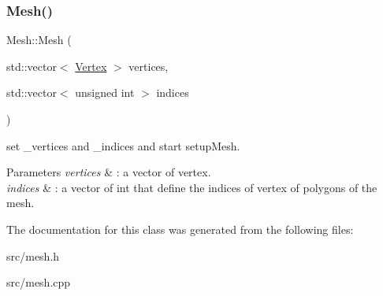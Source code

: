 \subsubsection{\texorpdfstring{Mesh()}{Mesh()}}
{\footnotesize\ttfamily Mesh\+::\+Mesh (\begin{DoxyParamCaption}\item[{std\+::vector$<$ \mbox{\hyperlink{class_vertex}{Vertex}} $>$}]{vertices,  }\item[{std\+::vector$<$ unsigned int $>$}]{indices }\end{DoxyParamCaption})}



set \+\_\+vertices and \+\_\+indices and start setup\+Mesh. 


\begin{DoxyParams}{Parameters}
{\em vertices} & \+: a vector of vertex. \\
\hline
{\em indices} & \+: a vector of int that define the indices of vertex of polygons of the mesh. \\
\hline
\end{DoxyParams}


The documentation for this class was generated from the following files\+:\begin{DoxyCompactItemize}
\item 
src/mesh.\+h\item 
src/mesh.\+cpp\end{DoxyCompactItemize}
